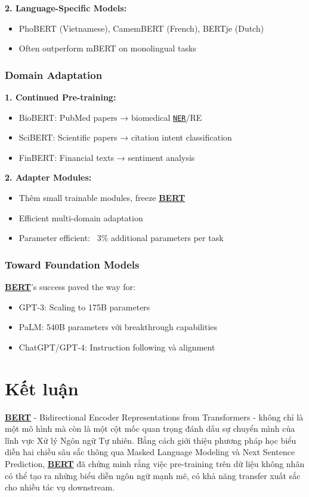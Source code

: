 \textbf{2.
Language-Specific Models:}
\begin{itemize}
    \item PhoBERT (Vietnamese), CamemBERT (French), BERTje (Dutch)
    \item Often outperform mBERT on monolingual tasks
\end{itemize}

\subsubsection{Domain Adaptation}

\textbf{1.
Continued Pre-training:}
\begin{itemize}
    \item BioBERT: PubMed papers → biomedical \hyperref[acro:ner]{\texttt{NER}}/RE
    \item SciBERT: Scientific papers → citation intent classification
    \item FinBERT: Financial texts → sentiment analysis
\end{itemize}

\textbf{2.
Adapter Modules:}
\begin{itemize}
    \item Thêm small trainable modules, freeze \hyperref[acro:bert]{\textbf{BERT}}
    \item Efficient multi-domain adaptation
    \item Parameter efficient: ~3\% additional parameters per task
\end{itemize}

\subsubsection{Toward Foundation Models}
\hyperref[acro:bert]{\textbf{BERT}}'s success paved the way for:
\begin{itemize}
    \item GPT-3: Scaling to 175B parameters
    \item PaLM: 540B parameters với breakthrough capabilities
    \item ChatGPT/GPT-4: Instruction following và alignment
\end{itemize}

\section{Kết luận}
\label{sec:ket_luan}
\hyperref[acro:bert]{\textbf{BERT}} - Bidirectional Encoder Representations from Transformers - không chỉ là một mô hình mà còn là một cột mốc quan trọng đánh dấu sự chuyển mình của lĩnh vực Xử
lý Ngôn ngữ Tự nhiên. Bằng cách giới thiệu phương pháp học biểu diễn hai chiều sâu sắc thông qua Masked Language Modeling và Next Sentence Prediction, \hyperref[acro:bert]{\textbf{BERT}} đã chứng minh rằng việc pre-training trên dữ liệu không nhãn có thể tạo ra những biểu diễn ngôn ngữ mạnh mẽ, có khả năng transfer xuất sắc cho nhiều tác vụ downstream.


